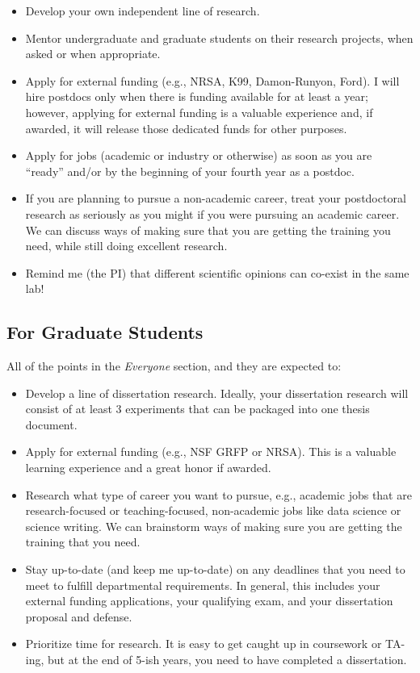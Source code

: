 \documentclass[
]{book}
\providecommand{\tightlist}{%
  \setlength{\itemsep}{0pt}\setlength{\parskip}{0pt}}
\begin{document}
\begin{itemize}
\tightlist
\item
  Develop your own independent line of research.
\item
  Mentor undergraduate and graduate students on their research projects, when asked or when appropriate.
\item
  Apply for external funding (e.g., NRSA, K99, Damon-Runyon, Ford). I will hire postdocs only when there is funding available for at least a year; however, applying for external funding is a valuable experience and, if awarded, it will release those dedicated funds for other purposes.
\item
  Apply for jobs (academic or industry or otherwise) as soon as you are ``ready'' and/or by the beginning of your fourth year as a postdoc.
\item
  If you are planning to pursue a non-academic career, treat your postdoctoral research as seriously as you might if you were pursuing an academic career. We can discuss ways of making sure that you are getting the training you need, while still doing excellent research.
\item
  Remind me (the PI) that different scientific opinions can co-exist in the same lab!
\end{itemize}

\hypertarget{for-graduate-students}{%
\subsection{For Graduate Students}\label{for-graduate-students}}

All of the points in the \emph{Everyone} section, and they are expected to:

\begin{itemize}
\tightlist
\item
  Develop a line of dissertation research. Ideally, your dissertation research will consist of at least 3 experiments that can be packaged into one thesis document.
\item
  Apply for external funding (e.g., NSF GRFP or NRSA). This is a valuable learning experience and a great honor if awarded.
\item
  Research what type of career you want to pursue, e.g., academic jobs that are research-focused or teaching-focused, non-academic jobs like data science or science writing. We can brainstorm ways of making sure you are getting the training that you need.
\item
  Stay up-to-date (and keep me up-to-date) on any deadlines that you need to meet to fulfill departmental requirements. In general, this includes your external funding applications, your qualifying exam, and your dissertation proposal and defense.
\item
  Prioritize time for research. It is easy to get caught up in coursework or TA-ing, but at the end of 5-ish years, you need to have completed a dissertation.
\end{itemize}
\end{document}
